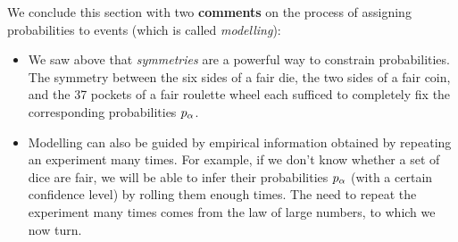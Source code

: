 We conclude this section with two \textbf{comments} on the process of assigning probabilities to events (which is called \textit{modelling}): \\[-24 pt]
\begin{itemize}
  \item We saw above that \textit{symmetries} are a powerful way to constrain probabilities.
        The symmetry between the six sides of a fair die, the two sides of a fair coin, and the 37 pockets of a fair roulette wheel each sufficed to completely fix the corresponding probabilities $p_{\alpha}$.
  \item Modelling can also be guided by empirical information obtained by repeating an experiment many times.
        For example, if we don't know whether a set of dice are fair, we will be able to infer their probabilities $p_{\alpha}$ (with a certain confidence level) by rolling them enough times.
        The need to repeat the experiment many times comes from the law of large numbers, to which we now turn.
\end{itemize}



